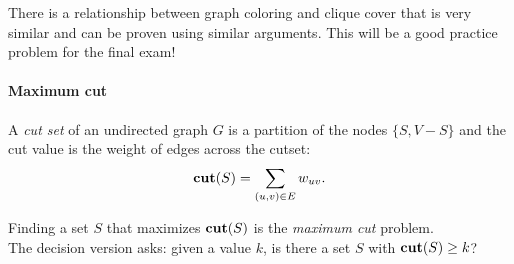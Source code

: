 \documentclass[11  pt]{article}
\begin{document}
\vfill
There is a relationship between graph coloring and clique cover that is very similar and can be proven using similar arguments. This will be a good practice problem for the final exam!

\newpage
\paragraph{Maximum cut}
A \emph{cut set} of an undirected graph $G$ is a partition of the nodes $\{S, V-S\}$ and the cut value is the weight of edges across the cutset:
\begin{equation}
	\textbf{cut}(S) = \sum_{(u,v) \in E} w_{uv}.
\end{equation}

Finding a set $S$ that maximizes $\textbf{cut}(S)$ is the \emph{maximum cut} problem.\\

The decision version asks: given a value $k$, is there a set $S$ with $\textbf{cut}(S) \geq k$? \\
	
\end{document}
